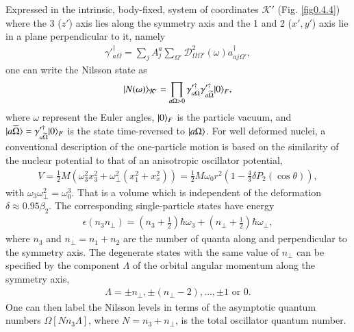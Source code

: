 Expressed in the intrinsic, body-fixed, system of coordinates $\mathcal K'$ (Fig. \ref{fig0.4.4}) where the 3 ($z'$) axis lies along the symmetry axis and the 1 and 2 ($x',y'$) axis lie in a plane perpendicular to it, namely
\begin{align}\label{eq0.4.6}
\gamma'^{\dagger}_{a\Omega}=\sum_jA_j^a\sum_{\Omega'}\mathcal D_{\Omega\Omega'}^2(\omega)a^\dagger_{aj\Omega'},
\end{align}
one can write the Nilsson state as 
\begin{align}\label{eq0.4.7}
|{N(\omega)} \rangle_{\mathcal K'}=\prod_{a\Omega>0}\gamma'^{\dagger}_{a\Omega}\gamma'^{\dagger}_{a\widetilde\Omega}|{0} \rangle_F,
\end{align}
where $\omega$ represent the Euler angles, $|{0} \rangle_F$ is the particle vacuum, and $|{a\widetilde\Omega} \rangle=\gamma'^{\dagger}_{a\widetilde\Omega}|{0} \rangle_F$ is the state time-reversed to $|{a\Omega} \rangle$. For well deformed nuclei, a conventional description of the one-particle motion is based on the similarity of the nuclear potential to that of an anisotropic oscillator potential, 
\begin{align}\label{eq0.4.8}
V=\frac{1}{2}M\left(\omega_3^2x_3^2+\omega^2_{\perp}(x_1^2+x_x^2)\right)=\frac{1}{2}M\omega_0r^2\left(1-\frac{4}{3}\delta P_2(\cos\theta)\right),
\end{align}
with $\omega_3\omega_{\perp}^2=\omega_0^3$. That is a volume which is independent of the deformation $\delta\approx0.95\beta_2$. The corresponding single-particle states have energy
\begin{align}\label{eq0.4.9}
\epsilon(n_3n_{\perp})=(n_3+\tfrac{1}{2})\hbar\omega_3+(n_{\perp}+\tfrac{1}{2})\hbar\omega_{\perp},
\end{align}
where $n_3$ and $n_{\perp}=n_1+n_2$ are the number of quanta along and perpendicular to the symmetry axis. The degenerate states with the same value of $n_{\perp}$ can be specified by the component $\Lambda$ of the orbital angular momentum along the symmetry axis,
\begin{align}\label{eq0.4.10}
\Lambda=\pm n_{\perp}, \pm(n_{\perp}-2),\dots,\pm 1\text{ or } 0.
\end{align}
One can then label the Nilsson levels in terms of the asymptotic quantum numbers $\Omega[Nn_3\Lambda]$, where $N=n_3+n_{\perp}$, is the total oscillator quantum number.
